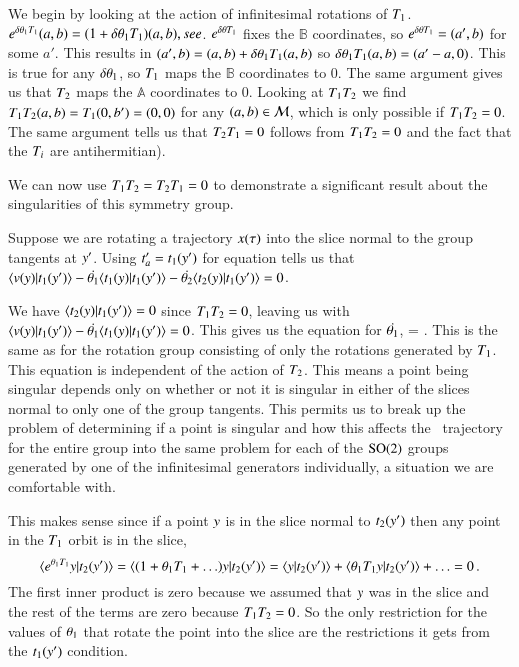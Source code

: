 We begin by looking at the action of infinitesimal rotations of $T_1$.
$e^{\delta {\bf \theta}_1 T_1}(a,b)=(1+\delta {\bf \theta}_1 T_1)
(a,b), see $. $e^{\delta {\bf \theta} T_1}$ fixes the
$\mathbb{B}$ coordinates, so $e^{\delta {\bf \theta} T_1}=(a',b)$ for some
$a'$. This results in $(a',b)=(a,b)+\delta {\bf \theta}_1 T_1(a,b)$ so
$\delta {\bf \theta}_1 T_1(a,b)=(a'-a,0)$. This is true for any $\delta
{\bf \theta}_1$, so $T_1$ maps the $\mathbb{B}$ coordinates to 0. The same
argument gives us that $T_2$ maps the $\mathbb{A}$ coordinates to 0.
Looking at $T_1 T_2$ we find $T_1 T_2 (a,b)=T_1 (0,b')=(0,0)$
for any $(a,b) \in {\cal M}$, which is only possible if $T_1
T_2=0$. The same argument tells us that $T_2 T_1=0$ %
follows from $T_1 T_2=0$ and the fact that the $T_i$ are
antihermitian).

We can now use $T_1 T_2=T_2 T_1=0$ to demonstrate a significant
result about the singularities of this symmetry group.

Suppose we are rotating a trajectory $x(\tau)$ into the slice normal
to the group tangents at ${y'}$. Using
$t'_{a}=t_1({y'})$ for equation
 tells us that
$\braket{\vel(\sspRed)}{\groupTan_1(\slicep)}-\dot{\gSpace_1} \braket{
\groupTan_1(\sspRed)}{\groupTan_1(\slicep)}-\dot{\gSpace_2} \braket{
\groupTan_2(\sspRed)}{\groupTan_1(\slicep)}=0$.

We have $\braket{\groupTan_2(\sspRed)}{\groupTan_1(\slicep)}=0$ since
$T_1 T_2=0$, leaving us with
$\braket{\vel(\sspRed)}{\groupTan_1(\slicep)}
-\dot{\gSpace_1}\braket{\groupTan_1(\sspRed)}{\groupTan_1(\slicep)}=0$.
This gives us the equation for $\dot{{\bf \theta}_1}$,
\beq
{}=
                     {}.
\eeq
This is the same as  for the rotation group
consisting of only the rotations generated by $T_1$. This equation is
independent of the action of $T_2$. This means a point being singular
depends only on whether or not it is singular in either of the slices
normal to only one of the group tangents. This permits us to break up the
problem of determining if a point is singular and how this affects the
\reducedsp\ trajectory for the entire group into the same problem for
each of the $\textrm{SO}(2)$ groups generated by one of the infinitesimal
generators individually, a situation we are comfortable with.

This makes sense since if a point $y$ is in the slice normal to
$t_2({y'})$ then any point in the $T_1$ orbit is in the
slice,
\[\braket{e^{\gSpace_1
\Lg_1}\sspRed}{\groupTan_2(\slicep)}=\braket{(1+\gSpace_1
\Lg_1+\ldots)\sspRed}{\groupTan_2(\slicep)}
=\braket{\sspRed}{\groupTan_2(\slicep)}+\braket{\gSpace_1
\Lg_1 \sspRed}{\groupTan_2(\slicep)}+\ldots=0
\,.
\]
The first inner product is zero because we assumed that $y$ was in the slice and the rest of the terms are zero because $T_1 T_2=0$. So the only restriction for the values of ${\bf \theta}_1$ that rotate the point into the slice are the restrictions it gets from the $t_1({y'})$ condition.

